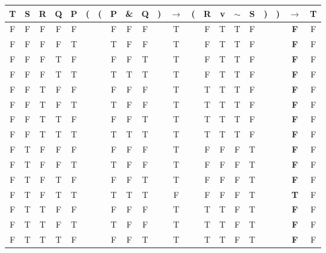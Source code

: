 \documentclass[a4paper,12pt]{article}
\newcommand{\mra}{$\rightarrow$ }
\newcommand{\ms}{$\sim$}
\begin{document}
\begin{enumerate}[label=\arabic*,leftmargin=*]
\begin{enumerate}[label=\arabic*.]
\begin{minipage}{\textwidth}
\begin{tabular}{c c c c c | c c c c c c c c c c c c c c c c}
                        T & S & R & Q & P & ( & ( & P & \& & Q & ) & \mra & ( & R & v & \ms & S & ) & ) & \mra        & T\\
                        \hline
                        F & F & F & F & F &   &   & F & F  & F &   & T   &   & F & T & T  & F &   &   & \textbf{F} & F\\
                        F & F & F & F & T &   &   & T & F  & F &   & T   &   & F & T & T  & F &   &   & \textbf{F} & F\\
                        F & F & F & T & F &   &   & F & F  & T &   & T   &   & F & T & T  & F &   &   & \textbf{F} & F\\
                        F & F & F & T & T &   &   & T & T  & T &   & T   &   & F & T & T  & F &   &   & \textbf{F} & F\\
                        F & F & T & F & F &   &   & F & F  & F &   & T   &   & T & T & T  & F &   &   & \textbf{F} & F\\
                        F & F & T & F & T &   &   & T & F  & F &   & T   &   & T & T & T  & F &   &   & \textbf{F} & F\\
                        F & F & T & T & F &   &   & F & F  & T &   & T   &   & T & T & T  & F &   &   & \textbf{F} & F\\
                        F & F & T & T & T &   &   & T & T  & T &   & T   &   & T & T & T  & F &   &   & \textbf{F} & F\\
                        F & T & F & F & F &   &   & F & F  & F &   & T   &   & F & F & F  & T &   &   & \textbf{F} & F\\
                        F & T & F & F & T &   &   & T & F  & F &   & T   &   & F & F & F  & T &   &   & \textbf{F} & F\\
                        F & T & F & T & F &   &   & F & F  & T &   & T   &   & F & F & F  & T &   &   & \textbf{F} & F\\
                        F & T & F & T & T &   &   & T & T  & T &   & F   &   & F & F & F  & T &   &   & \textbf{T} & F\\
                        F & T & T & F & F &   &   & F & F  & F &   & T   &   & T & T & F  & T &   &   & \textbf{F} & F\\
                        F & T & T & F & T &   &   & T & F  & F &   & T   &   & T & T & F  & T &   &   & \textbf{F} & F\\
                        F & T & T & T & F &   &   & F & F  & T &   & T   &   & T & T & F  & T &   &   & \textbf{F} & F\\

\end{tabular}
\end{minipage}
\end{enumerate}
\end{enumerate}
\end{document}
